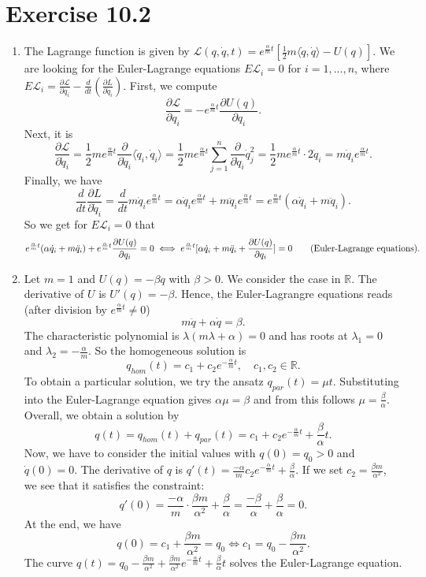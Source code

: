 \documentclass[a4paper]{article}
\theoremstyle{plain}
\begin{document}
\section*{Exercise 10.2}
\begin{enumerate}[label=(\alph*)]
	\item The Lagrange function is given by $\mathcal L(q, \dot q, t) = e^{\frac{\alpha}{m} t}[\frac{1}{2} m \langle \dot q, \dot q \rangle - U(q)]$. We are looking for the Euler-Lagrange equations $E\mathcal L_i = 0$ for $i = 1,...,n$, where $E \mathcal L_i = \frac{\partial \mathcal L}{\partial q_i} - \frac{d}{dt}(\frac{\partial L}{\partial \dot q_i})$. First, we compute 
	$$\frac{\partial \mathcal  L}{\partial q_i} = -e^{\frac{\alpha}{m} t} \frac{\partial U(q)}{\partial q_i}.$$
	Next, it is $$\frac{\partial \mathcal L}{\partial \dot q_i} = \frac{1}{2}me^{\frac{\alpha}{m}t} \frac{\partial}{\partial \dot q_i} \langle \dot q_i, \dot q_i \rangle =  \frac{1}{2}me^{\frac{\alpha}{m}t} \sum_{j=1}^n \frac{\partial}{\partial \dot q_i} \dot q_j^2 = \frac{1}{2}me^{\frac{\alpha}{m}t} \cdot 2 \dot q_i = m\dot q_i e^{\frac{\alpha}{m}t}.$$
	 Finally, we have 
	$$\frac{d}{dt} \frac{\partial L}{\partial \dot q_i} = \frac{d}{dt} m\dot q_i e^{\frac{\alpha}{m}t} = \alpha \dot q_i e^{\frac{\alpha}{m}t} + m\ddot q_i e^{\frac{\alpha}{m}t} = e^{\frac{\alpha}{m}t}(\alpha \dot q_i + m \ddot q_i).$$
	 So we get for $E \mathcal L_i = 0$ that
	\[
		 e^{\frac{\alpha}{m}t}(\alpha \dot q_i + m \ddot q_i) + e^{\frac{\alpha}{m} t} \frac{\partial U(q)}{\partial q_i} = 0 \iff e^{\frac{\alpha}{m}t}[\alpha \dot q_i + m \ddot q_i + \frac{\partial U(q)}{\partial q_i}]= 0 \tag{\text{Euler-Lagrange equations}}.
	\]
	
	\item Let $m = 1$ and $U(q) = -\beta q$ with $\beta > 0$. We consider the case in $\mathbb R$. The derivative of $U$ is $U'(q) = -\beta$. Hence, the Euler-Lagrangre equations reads (after division by $e^{\frac{\alpha}{m}t} \neq 0$)
	\[
		m \ddot q + \alpha \dot q = \beta.
	\]
	The characteristic polynomial is $\lambda(m \lambda + \alpha )= 0$ and has roots at $\lambda_1 = 0$ and $\lambda_2 = - \frac{\alpha}{m}$. So the homogeneous solution is
	\[
		q_{hom}(t) = c_1 + c_2 e^{-\frac{\alpha}{m}t}, \quad c_1,c_2 \in \mathbb R.
	\]
	To obtain a particular solution, we try the ansatz $q_{par}(t) = \mu t$. Substituting into the Euler-Lagrange equation gives $\alpha \mu = \beta$ and from this follows $\mu = \frac{\beta}{\alpha}$. Overall, we obtain a solution by
	\[
		q(t) = q_{hom}(t) + q_{par}(t) = c_1 + c_2 e^{-\frac{\alpha}{m}t} + \frac{\beta}{\alpha}t.
	\]
	Now, we have to consider the initial values with $q(0) = q_0 > 0$ and $\dot q(0) = 0$. The derivative of $q$ is $q'(t) = \frac{-\alpha}{m}c_2 e^{-\frac{\alpha}{m} t} + \frac{\beta}{\alpha}$. If we set $c_2 = \frac{\beta m}{\alpha^2}$, we see that it satisfies the constraint:
	$$q'(0) =  \frac{-\alpha}{m} \cdot \frac{\beta m}{\alpha^2} + \frac{\beta}{\alpha} = \frac{-\beta}{\alpha} + \frac{\beta}{\alpha} = 0.$$
	At the end, we have 
	\[
		q(0) = c_1 + \frac{\beta m}{\alpha^2} = q_0 \iff c_1 = q_0 - \frac{\beta m}{\alpha^2}.
	\]
	The curve $q(t) = q_0 - \frac{\beta m}{\alpha^2} + \frac{\beta m}{\alpha^2} e^{-\frac{\alpha}{m}t} + \frac{\beta}{\alpha}t$ solves the Euler-Lagrange equation.
	

\end{enumerate}
\end{document}
